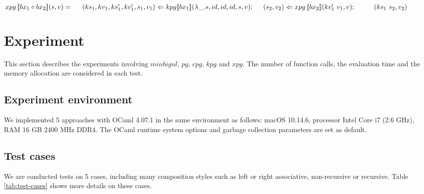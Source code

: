 \documentclass[runningheads]{llncs}
\newcommand{\tab}{\hspace*{5mm}}
\newcommand{\qtab}{\hspace*{5mm} \ \quad}
\newcommand{\kpg}[7]{kpg [\![#1]\!] (#2, #3, #4, #5, #6, #7)}
\newcommand{\xpg}[3]{xpg \, [\![#1]\!] (#2, #3)}
\begin{document}
$\xpg{bx_1 \circ bx_2}{s}{v} =\\
    \tab (ks_1,kv_1, ks_1', kv_1', s_1, v_1) \Leftarrow \kpg{bx_1}{\lambda \_.s}{id}{id}{id}{s}{v};\\
    \tab (s_2, v_2) \Leftarrow \xpg{bx_2}{kv_1' \ v_1}{v};\\
    \qtab (ks_1 \ s_2, v_2)$

\section{Experiment}

This section describes the experiments involving $minbigul$, $pg$, $cpg$, $kpg$ and $xpg$. The number of function calls, the evaluation time and the memory allocation are considered in each test.

\subsection{Experiment environment}
We implemented 5 approaches with OCaml 4.07.1 in the same environment as follows: macOS 10.14.6, processor Intel Core i7 (2.6 GHz), RAM 16 GB 2400 MHz DDR4. The OCaml runtime system options and garbage collection parameters are set as default.  

\subsection{Test cases}
We are conducted tests on 5 cases, including many composition styles such as left or right associative, non-recursive or recursive. Table \ref{tab:test-cases} shows more details on these cases.
\end{document}
